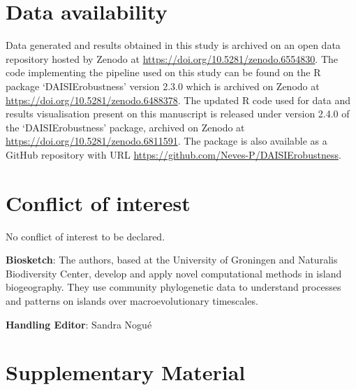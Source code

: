 \documentclass{article}
\begin{document}
\section*{Data availability}

Data generated and results obtained in this study is archived on an open data repository hosted by Zenodo at \url{https://doi.org/10.5281/zenodo.6554830}. The code implementing the pipeline used on this study can be found on the R package `DAISIErobustness' version 2.3.0 which is archived on Zenodo at \url{https://doi.org/10.5281/zenodo.6488378}. The updated R code used for data and results visualisation present on this manuscript is released under version 2.4.0 of the `DAISIErobustness' package, archived on Zenodo at \url{https://doi.org/10.5281/zenodo.6811591}. The package is also available as a GitHub repository with URL \url{https://github.com/Neves-P/DAISIErobustness}.

\section*{Conflict of interest}

No conflict of interest to be declared.





\noindent \textbf{Biosketch}: The authors, based at the University of Groningen and Naturalis Biodiversity Center, develop and apply novel computational methods in island biogeography. They use community phylogenetic data to understand processes and patterns on islands over macroevolutionary timescales.

\noindent \textbf{Handling Editor}: Sandra Nogué

\clearpage

\newcommand{\beginsupplement}{%
        \setcounter{table}{0}
        \renewcommand{\thetable}{S\arabic{table}}%
        \setcounter{figure}{0}
        \renewcommand{\thefigure}{S\arabic{figure}}%
     }
     
\beginsupplement
\section*{Supplementary Material}

\end{document}
